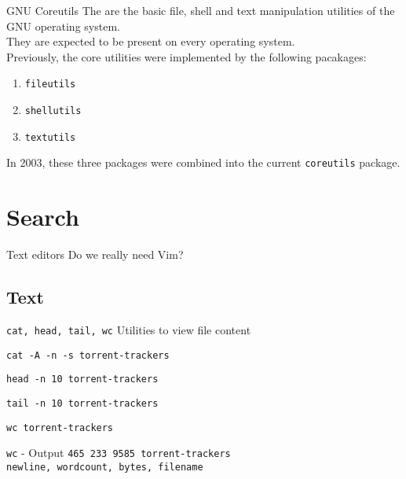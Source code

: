 \documentclass[11pt]{beamer}
\begin{document}
		\begin{frame}{GNU Coreutils}
			The {\textbf{\color{darkpurple}{GNU Core Utilities}}} are the basic file, shell and text manipulation utilities of the GNU operating system. \\
				They are expected to be present on every operating system. \\
				Previously, the core utilities were implemented by the following pacakages:
				\begin{enumerate}
				  \item \texttt{fileutils} 
				  \item \texttt{shellutils} 
				  \item \texttt{textutils}
				\end{enumerate}	
				In 2003, these three packages were combined into the current \texttt{coreutils} package.
		\end{frame}
	
	\section{Search}
		\begin{frame}{Text editors}
			Do we really need Vim?	
		\end{frame}
		\subsection{Text}
			\begin{frame}{\texttt{cat, head, tail, wc}}
				Utilities to view file content
				\begin{example}
					\texttt{cat -A -n -s torrent-trackers}
				\end{example}
				\begin{example}
					\texttt{head -n 10 torrent-trackers}
				\end{example}
				\begin{example}
					\texttt{tail -n 10 torrent-trackers}
				\end{example}
				\begin{example}
					\texttt{wc torrent-trackers}
				\end{example}
				{
					\begin{alertblock}{\texttt{wc} - Output}
						\texttt{465  233 9585 torrent-trackers} \\
						\tiny \texttt{newline, wordcount, bytes, filename}
					\end{alertblock}
				}
			\end{frame}
\end{document}
